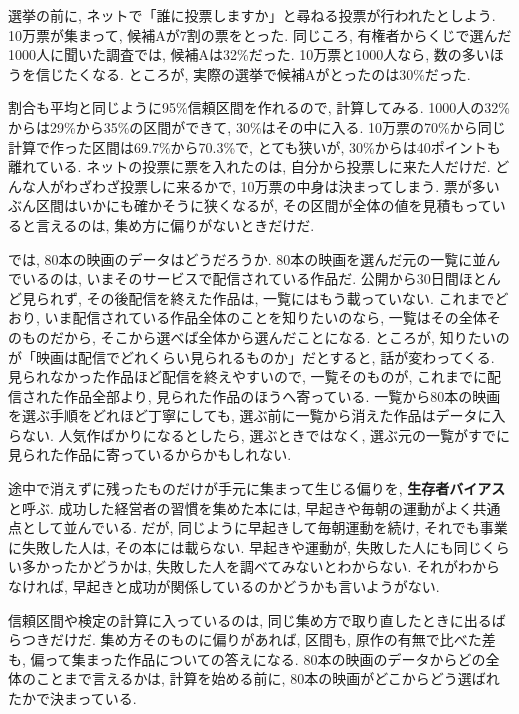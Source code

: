     選挙の前に, ネットで「誰に投票しますか」と尋ねる投票が行われたとしよう.
    10万票が集まって, 候補Aが7割の票をとった.
    同じころ, 有権者からくじで選んだ1000人に聞いた調査では, 候補Aは32\%だった.
    10万票と1000人なら, 数の多いほうを信じたくなる.
    ところが, 実際の選挙で候補Aがとったのは30\%だった.

    割合も平均と同じように95\%信頼区間を作れるので, 計算してみる.
    1000人の32\%からは29\%から35\%の区間ができて, 30\%はその中に入る.
    10万票の70\%から同じ計算で作った区間は69.7\%から70.3\%で, とても狭いが, 30\%からは40ポイントも離れている.
    ネットの投票に票を入れたのは, 自分から投票しに来た人だけだ.
    どんな人がわざわざ投票しに来るかで, 10万票の中身は決まってしまう.
    票が多いぶん区間はいかにも確かそうに狭くなるが, その区間が全体の値を見積もっていると言えるのは, 集め方に偏りがないときだけだ.

    では, 80本の映画のデータはどうだろうか.
    80本の映画を選んだ元の一覧に並んでいるのは, いまそのサービスで配信されている作品だ.
    公開から30日間ほとんど見られず, その後配信を終えた作品は, 一覧にはもう載っていない.
    これまでどおり, いま配信されている作品全体のことを知りたいのなら, 一覧はその全体そのものだから, そこから選べば全体から選んだことになる.
    ところが, 知りたいのが「映画は配信でどれくらい見られるものか」だとすると, 話が変わってくる.
    見られなかった作品ほど配信を終えやすいので, 一覧そのものが, これまでに配信された作品全部より, 見られた作品のほうへ寄っている.
    一覧から80本の映画を選ぶ手順をどれほど丁寧にしても, 選ぶ前に一覧から消えた作品はデータに入らない.
    人気作ばかりになるとしたら, 選ぶときではなく, 選ぶ元の一覧がすでに見られた作品に寄っているからかもしれない.

    途中で消えずに残ったものだけが手元に集まって生じる偏りを, \textbf{生存者バイアス}と呼ぶ.
    成功した経営者の習慣を集めた本には, 早起きや毎朝の運動がよく共通点として並んでいる.
    だが, 同じように早起きして毎朝運動を続け, それでも事業に失敗した人は, その本には載らない.
    早起きや運動が, 失敗した人にも同じくらい多かったかどうかは, 失敗した人を調べてみないとわからない.
    それがわからなければ, 早起きと成功が関係しているのかどうかも言いようがない.

    信頼区間や検定の計算に入っているのは, 同じ集め方で取り直したときに出るばらつきだけだ.
    集め方そのものに偏りがあれば, 区間も, 原作の有無で比べた差も, 偏って集まった作品についての答えになる.
    80本の映画のデータからどの全体のことまで言えるかは, 計算を始める前に, 80本の映画がどこからどう選ばれたかで決まっている.

